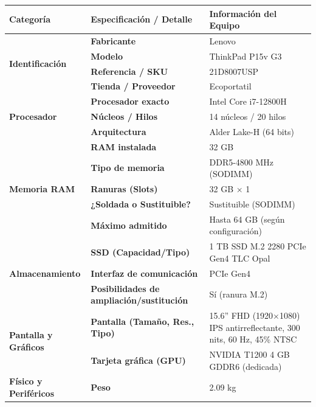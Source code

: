\documentclass[11.5pt]{article}
\begin{document}
	\begin{table}[H]
		\centering
		\footnotesize
		\renewcommand{\arraystretch}{1.2}
		\begin{tabularx}{\textwidth}{|l|l|X|}
			\hline
			\textbf{Categoría} & \textbf{Especificación / Detalle} & \textbf{Información del Equipo} \\
			\hline
			\multirow{4}{*}{\textbf{Identificación}} 
			& \textbf{Fabricante} & Lenovo \\
			\cline{2-3}
			& \textbf{Modelo} & ThinkPad P15v G3 \\
			\cline{2-3}
			& \textbf{Referencia / SKU} & 21D8007USP \\
			\cline{2-3}
			& \textbf{Tienda / Proveedor} & Ecoportatil \\
			\hline
			\multirow{3}{*}{\textbf{Procesador}} 
			& \textbf{Procesador exacto} & Intel Core i7-12800H \\
			\cline{2-3}
			& \textbf{Núcleos / Hilos} & 14 núcleos / 20 hilos \\
			\cline{2-3}
			& \textbf{Arquitectura} & Alder Lake-H (64 bits) \\
			\hline
			\multirow{5}{*}{\textbf{Memoria RAM}} 
			& \textbf{RAM instalada} & 32 GB \\
			\cline{2-3}
			& \textbf{Tipo de memoria} & DDR5-4800 MHz (SODIMM) \\
			\cline{2-3}
			& \textbf{Ranuras (Slots)} & 32 GB \(\times\) 1 \\
			\cline{2-3}
			& \textbf{¿Soldada o Sustituible?} & Sustituible (SODIMM) \\
			\cline{2-3}
			& \textbf{Máximo admitido} & Hasta 64 GB (según configuración) \\
			\hline
			\multirow{3}{*}{\textbf{Almacenamiento}} 
			& \textbf{SSD (Capacidad/Tipo)} & 1 TB SSD M.2 2280 PCIe Gen4 TLC Opal \\
			\cline{2-3}
			& \textbf{Interfaz de comunicación} & PCIe Gen4 \\
			\cline{2-3}
			& \textbf{Posibilidades de ampliación/sustitución} & Sí (ranura M.2) \\
			\hline
			\multirow{2}{*}{\textbf{Pantalla y Gráficos}} 
			& \textbf{Pantalla (Tamaño, Res., Tipo)} & 15.6'' FHD (1920\(\times\)1080) IPS antirreflectante, 300 nits, 60 Hz, 45\% NTSC \\
			\cline{2-3}
			& \textbf{Tarjeta gráfica (GPU)} & NVIDIA T1200 4 GB GDDR6 (dedicada) \\
			\hline
			\multirow{4}{*}{\textbf{Físico y Periféricos}} 
			& \textbf{Peso} & 2.09 kg \\

\end{tabularx}
\end{table}
\end{document}
